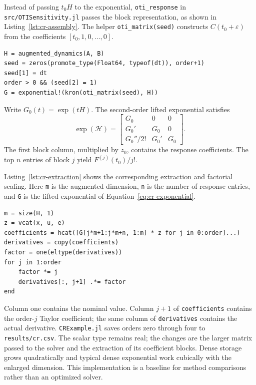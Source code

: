 \documentclass[10pt]{article}
\begin{document}
Instead of passing $t_0H$ to the exponential, \texttt{oti\_response} in
\texttt{src/OTISensitivity.jl} passes the block representation, as shown in
Listing~\ref{lst:cr-assembly}. The helper \texttt{oti\_matrix(seed)} constructs
$C(t_0+\varepsilon)$ from the coefficients $[t_0,1,0,\ldots,0]$.
\begin{lstlisting}[caption={OTI seed and real block exponential.},label={lst:cr-assembly}]
H = augmented_dynamics(A, B)
seed = zeros(promote_type(Float64, typeof(dt)), order+1)
seed[1] = dt
order > 0 && (seed[2] = 1)
G = exponential!(kron(oti_matrix(seed), H))
\end{lstlisting}
Write $G_0(t)=\exp(tH)$. The second-order lifted exponential satisfies
\begin{equation}
\label{eq:cr-exponential}
 \exp(\mathcal H)=
 \begin{bmatrix}G_0&0&0\\G_0'&G_0&0\\G_0''/2!&G_0'&G_0\end{bmatrix}.
\end{equation}
The first block column, multiplied by $z_0$, contains the response coefficients.
The top $n$ entries of block $j$ yield $F^{(j)}(t_0)/j!$.

\newpage
Listing~\ref{lst:cr-extraction} shows the corresponding extraction and factorial
scaling. Here \texttt{m} is the augmented dimension, \texttt{n} is the number of
response entries, and \texttt{G} is the lifted exponential of
Equation~\eqref{eq:cr-exponential}.
\begin{lstlisting}[caption={Extraction of OTI coefficients and conversion to derivatives.},label={lst:cr-extraction}]
m = size(H, 1)
z = vcat(x, u, e)
coefficients = hcat([G[j*m+1:j*m+n, 1:m] * z for j in 0:order]...)
derivatives = copy(coefficients)
factor = one(eltype(derivatives))
for j in 1:order
    factor *= j
    derivatives[:, j+1] .*= factor
end
\end{lstlisting}
Column one contains the nominal value. Column $j+1$ of \texttt{coefficients}
contains the order-$j$ Taylor coefficient; the same column of \texttt{derivatives}
contains the actual derivative. \texttt{CRExample.jl} saves orders zero through
four to \texttt{results/cr.csv}. The scalar type remains real; the changes are
the larger matrix passed to the solver and the extraction of its coefficient
blocks. Dense storage grows quadratically and typical dense exponential work
cubically with the enlarged dimension. This implementation is a baseline for
method comparisons rather than an optimized solver.
\end{document}
